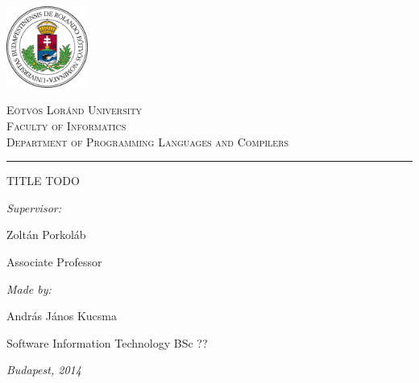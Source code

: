 \begin{titlepage}

\noindent
\parbox[m]{0.2\textwidth}{
    \includegraphics[width=0.2\textwidth]{img/elte_logo_colored.eps} %
}
\hfill
\parbox[m]{0.7\textwidth}{
    \begin{center}
    \begin{large}
    \textsc{
        Eötvös Loránd University\\
        \vspace{0.5pc}
        Faculty of Informatics\\
        \vspace{0.5pc}
        Department of Programming Languages and Compilers\\
    }
    \end{large}
    \end{center}
}

\vspace{1pc}
\hrule

\vfill

\begin{center}
    {\LARGE TITLE TODO}
\end{center}

\vfill

\noindent
\hspace*{0.05\textwidth}
\parbox{0.45\textwidth}{
    {\it Supervisor:}
    \bigskip

    {\Large Zoltán Porkoláb}
    \smallskip

    Associate Professor
}
\hfill
\parbox{0.45\textwidth}{
    {\it Made by:}
    \bigskip

    {\Large András János Kucsma}
    \smallskip

    Software Information Technology BSc ??
}


\vfill

\begin{center}
    {\large {\it Budapest, 2014}}
\end{center}

\end{titlepage}
